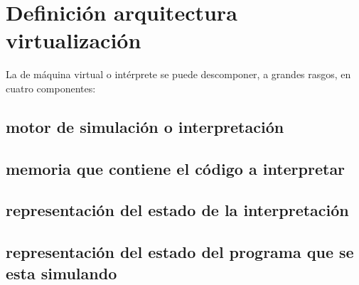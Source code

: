 \chapter{Definición arquitectura virtualización}

\lettrine[lines=1,slope=4pt,findent=0pt]{L}{}a de máquina virtual o intérprete se puede descomponer, a grandes rasgos, en cuatro componentes:
\section{motor de simulación o interpretación}
\section{memoria que contiene el código a interpretar}
\section{representación del estado de la interpretación}
\section{representación del estado del programa que se esta
simulando}